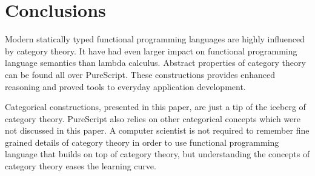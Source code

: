 \documentclass[article]{aaltoseries}
\begin{document}

\section{Conclusions}

Modern statically typed functional programming languages are highly influenced
by category theory. It have had even larger impact on functional programming
language semantics than lambda calculus. Abstract properties of category theory
can be found all over PureScript. These constructions provides enhanced
reasoning and proved tools to everyday application development.
 
Categorical constructions, presented in this paper, are just a tip of the
iceberg of category theory. PureScript also relies on other categorical concepts
which were not discussed in this paper. A computer scientist is not required to
remember fine grained details of category theory in order to use functional
programming language that builds on top of category theory, but understanding
the concepts of category theory eases the learning curve.




\end{document}
